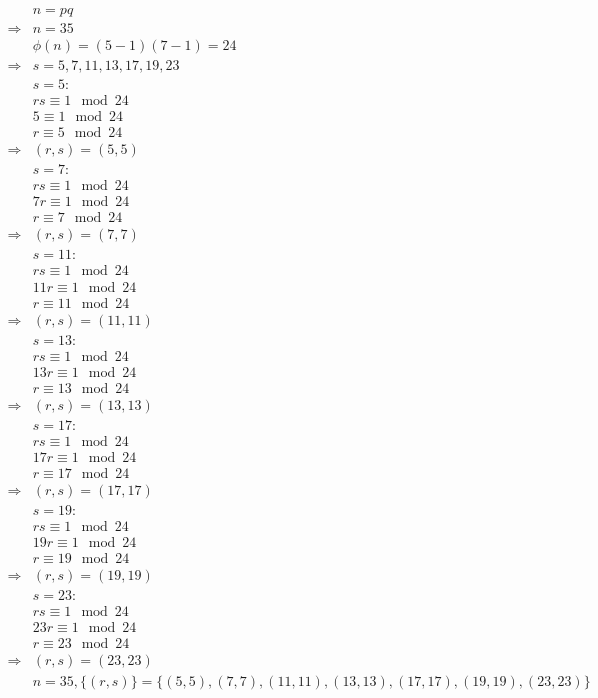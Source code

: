 \documentclass{article}
\begin{document}
\begin{align*}
    &n=pq\\
    \Rightarrow&n=35\\
    &\phi(n)=(5-1)(7-1)=24\\
    \Rightarrow&s=5,7,11,13,17,19,23\\
    &s=5:\\
    &rs\equiv 1\mod 24\\
    &5\equiv 1\mod 24\\
    &r\equiv 5\mod 24\\
    \Rightarrow&(r,s)=(5,5)\\
    &s=7:\\
    &rs\equiv 1\mod 24\\
    &7r\equiv 1\mod 24\\
    &r\equiv 7\mod 24\\
    \Rightarrow&(r,s)=(7,7)\\
    &s=11:\\
    &rs\equiv 1\mod 24\\
    &11r\equiv 1\mod 24\\
    &r\equiv 11\mod 24\\
    \Rightarrow&(r,s)=(11,11)\\
    &s=13:\\
    &rs\equiv 1\mod 24\\
    &13r\equiv 1\mod 24\\
    &r\equiv 13\mod 24\\
    \Rightarrow&(r,s)=(13,13)\\
    &s=17:\\
    &rs\equiv 1\mod 24\\
    &17r\equiv 1\mod 24\\
    &r\equiv 17\mod 24\\
    \Rightarrow&(r,s)=(17,17)\\
    &s=19:\\
    &rs\equiv 1\mod 24\\
    &19r\equiv 1\mod 24\\
    &r\equiv 19\mod 24\\
    \Rightarrow&(r,s)=(19,19)\\
    &s=23:\\
    &rs\equiv 1\mod 24\\
    &23r\equiv 1\mod 24\\
    &r\equiv 23\mod 24\\
    \Rightarrow&(r,s)=(23,23)\\
    &n=35,\{(r,s)\}=\{(5,5),(7,7),(11,11),(13,13),(17,17),(19,19),(23,23)\}\\
\end{align*}
\end{document}
